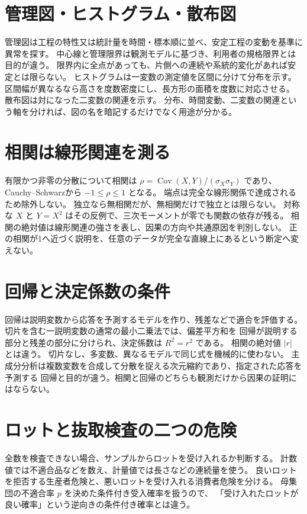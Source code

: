 \section{管理図・ヒストグラム・散布図}
\label{theory:quality:charts}
管理図は工程の特性又は統計量を時間・標本順に並べ、安定工程の変動を基準に異常を探す。
中心線と管理限界は観測モデルに基づき、利用者の規格限界とは目的が違う。
限界内に全点があっても、片側への連続や系統的変化があれば安定とは限らない。
ヒストグラムは一変数の測定値を区間に分けて分布を示す。
区間幅が異なるなら高さを度数密度にし、長方形の面積を度数に対応させる。
散布図は対になった二変数の関連を示す。
分布、時間変動、二変数の関連という軸を分ければ、図の名を暗記するだけでなく用途が分かる。
\cite{quality_nist_control,quality_nist_histogram}

\section{相関は線形関連を測る}
\label{theory:quality:correlation}
有限かつ非零の分散について相関は
\(\rho=\operatorname{Cov}(X,Y)/(\sigma_X\sigma_Y)\) であり、
Cauchy--Schwarzから \(-1\le\rho\le1\) となる。
端点は完全な線形関係で達成されるため除外しない。
独立なら無相関だが、無相関だけで独立とは限らない。
対称な \(X\) と \(Y=X^2\) はその反例で、三次モーメントが零でも関数の依存が残る。
相関の絶対値は線形関連の強さを表し、因果の方向や共通原因を判別しない。
正の相関が1へ近づく説明を、任意のデータが完全な直線上にあるという断定へ変えない。

\section{回帰と決定係数の条件}
\label{theory:quality:regression}
回帰は説明変数から応答を予測するモデルを作り、残差などで適合を評価する。
切片を含む一説明変数の通常の最小二乗法では、偏差平方和を
回帰が説明する部分と残差の部分に分けられ、決定係数は \(R^2=r^2\) である。
相関の絶対値 \(|r|\) とは違う。
切片なし、多変数、異なるモデルで同じ式を機械的に使わない。
主成分分析は複数変数を合成して分散を捉える次元縮約であり、指定された応答を予測する
回帰と目的が違う。相関と回帰のどちらも観測だけから因果の証明にはならない。
\cite{stat_psu_correlation}

\section{ロットと抜取検査の二つの危険}
\label{theory:quality:acceptance}
全数を検査できない場合、サンプルからロットを受け入れるか判断する。
計数値では不適合品などを数え、計量値では長さなどの連続量を使う。
良いロットを拒否する生産者危険と、悪いロットを受け入れる消費者危険を分ける。
母集団の不適合率 \(p\) を決めた条件付き受入確率を扱うので、
「受け入れたロットが良い確率」という逆向きの条件付き確率とは違う。
\cite{quality_nist_sampling}

